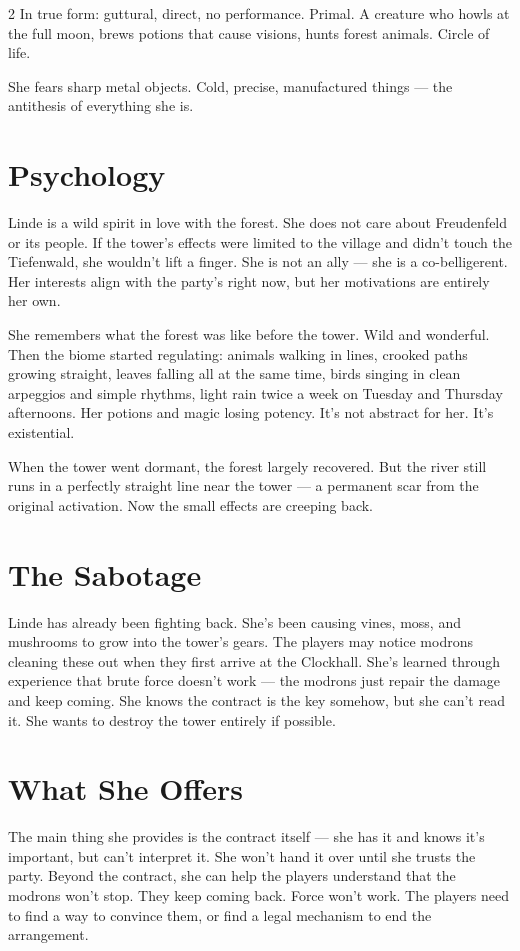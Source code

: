 \documentclass[10pt,letterpaper]{article}
\begin{document}
\begin{multicols}{2}
In true form: guttural, direct, no performance. Primal. A creature who howls at the full moon, brews potions that cause visions, hunts forest animals. Circle of life.

She fears sharp metal objects. Cold, precise, manufactured things --- the antithesis of everything she is.

\section*{Psychology}
Linde is a wild spirit in love with the forest. She does not care about Freudenfeld or its people. If the tower's effects were limited to the village and didn't touch the Tiefenwald, she wouldn't lift a finger. She is not an ally --- she is a co-belligerent. Her interests align with the party's right now, but her motivations are entirely her own.

She remembers what the forest was like before the tower. Wild and wonderful. Then the biome started regulating: animals walking in lines, crooked paths growing straight, leaves falling all at the same time, birds singing in clean arpeggios and simple rhythms, light rain twice a week on Tuesday and Thursday afternoons. Her potions and magic losing potency. It's not abstract for her. It's existential.

When the tower went dormant, the forest largely recovered. But the river still runs in a perfectly straight line near the tower --- a permanent scar from the original activation. Now the small effects are creeping back.

\section*{The Sabotage}
Linde has already been fighting back. She's been causing vines, moss, and mushrooms to grow into the tower's gears. The players may notice modrons cleaning these out when they first arrive at the Clockhall. She's learned through experience that brute force doesn't work --- the modrons just repair the damage and keep coming. She knows the contract is the key somehow, but she can't read it. She wants to destroy the tower entirely if possible.

\section*{What She Offers}
The main thing she provides is the contract itself --- she has it and knows it's important, but can't interpret it. She won't hand it over until she trusts the party. Beyond the contract, she can help the players understand that the modrons won't stop. They keep coming back. Force won't work. The players need to find a way to convince them, or find a legal mechanism to end the arrangement.


\end{multicols}
\end{document}
